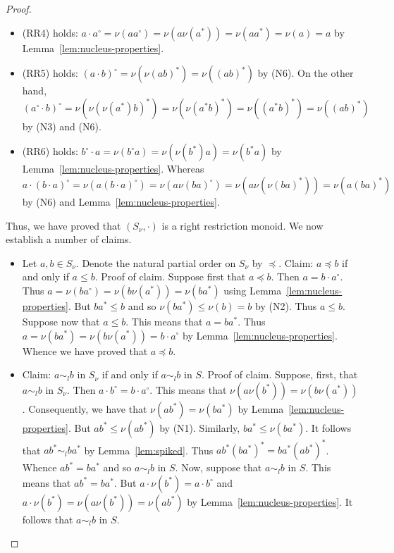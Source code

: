 \documentclass[a4paper]{amsart}
\begin{document}
\begin{proof}
\begin{itemize}
\item (RR4) holds: $a \cdot a^{\circ} = \nu (aa^{\circ}) = \nu (a\nu(a^{\ast})) = \nu (aa^{\ast}) = \nu (a) = a$ by Lemma~\ref{lem:nucleus-properties}.

\item (RR5) holds: $(a \cdot b)^{\circ} = \nu(\nu (ab)^{\ast}) = \nu ((ab)^{\ast})$ by (N6).
On the other hand, $(a^{\circ} \cdot b)^{\circ} = \nu ( \nu (\nu(a^{\ast})b)^{\ast}) = \nu (\nu (a^{\ast}b)^{\ast}) = \nu ((a^{\ast}b)^{\ast}) = \nu ((ab)^{\ast})$
by (N3) and (N6).

\item (RR6) holds:
$b^{\circ} \cdot a = \nu (b^{\circ}a) = \nu (\nu(b^{\ast})a) = \nu (b^{\ast}a)$ by Lemma~\ref{lem:nucleus-properties}.
Whereas
$a \cdot (b \cdot a)^{\circ} = \nu (a(b \cdot a)^{\circ}) = \nu (a \nu(ba)^{\circ}) = \nu (a \nu (\nu (ba)^{\ast})) = \nu (a(ba)^{\ast})$
by (N6) and  Lemma~\ref{lem:nucleus-properties}.
\end{itemize}


Thus, we have proved that $(S_{\nu},\cdot)$ is a right restriction monoid.
We now establish a number of claims.
\begin{itemize}


\item Let $a,b \in S_{\nu}$.
Denote the natural partial order on $S_{\nu}$ by $\preceq$.
Claim: $a \preceq b$ if and only if $a \leq b$.
Proof of claim.
Suppose first that $a \preceq b$.
Then $a = b \cdot a^{\circ}$.
Thus $a = \nu (ba^{\circ}) = \nu (b \nu(a^{\ast})) = \nu (ba^{\ast})$
using Lemma~\ref{lem:nucleus-properties}.
But $ba^{\ast} \leq b$ and so $\nu (ba^{\ast}) \leq \nu (b) = b$ by (N2).
Thus $a \leq b$.
Suppose now that $a \leq b$.
This means that $a = ba^{\ast}$.
Thus $a = \nu(ba^{\ast}) = \nu (b \nu (a^{\ast})) = b \cdot a^{\circ}$
by Lemma~\ref{lem:nucleus-properties}.
Whence we have proved that $a \preceq b$.

\item Claim:  $a \sim_{l} b$ in $S_{\nu}$ if and only if $a \sim_{l} b$ in $S$.
Proof of claim.
Suppose, first, that $a \sim_{l} b$ in $S_{\nu}$.
Then $a \cdot b^{\circ} = b \cdot a^{\circ}$.
This means that $\nu (a \nu (b^\ast)) = \nu (b \nu (a^{\ast}))$.
Consequently, we have that $\nu (ab^{\ast}) = \nu (ba^{\ast})$
by  Lemma~\ref{lem:nucleus-properties}.
But $ab^{\ast} \leq \nu (ab^{\ast})$ by (N1).
Similarly, $ba^{\ast} \leq  \nu (ba^{\ast})$.
It follows that $ab^{\ast} \sim_{l} ba^{\ast}$ by Lemma~\ref{lem:spiked}.
Thus $ab^{\ast}(ba^{\ast})^{\ast} = ba^{\ast}(ab^{\ast})^{\ast}$.
Whence $ab^{\ast} = ba^{\ast}$ and so $a \sim_{l} b$ in $S$.
Now, suppose that $a \sim_{l} b$ in $S$.
This means that $ab^{\ast} = ba^{\ast}$.
But $a \cdot \nu (b^{\ast}) = a \cdot b^{\circ}$
and $a \cdot \nu (b^{\ast}) = \nu (a \nu (b^{\ast})) = \nu (ab^{\ast})$ by Lemma~\ref{lem:nucleus-properties}.
It follows that $a \sim_{l} b$ in $S$.


\end{itemize}
\end{proof}
\end{document}
